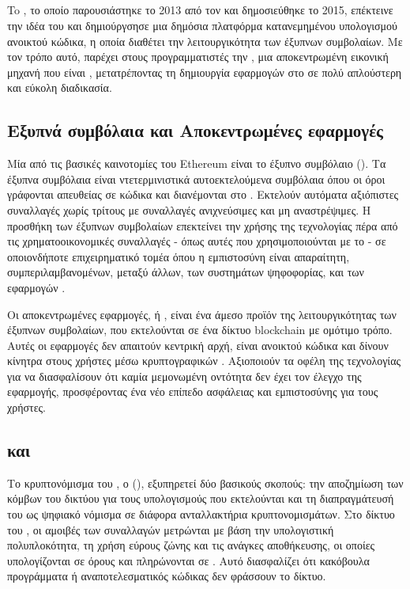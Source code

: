 \subsection{}
To , το οποίο παρουσιάστηκε το 2013 από τον  και δημοσιεύθηκε το 2015, επέκτεινε την ιδέα του  και δημιούργσησε μια δημόσια πλατφόρμα κατανεμημένου υπολογισμού ανοικτού κώδικα, η οποία διαθέτει την λειτουργικότητα των έξυπνων συμβολαίων. Με τον τρόπο αυτό, παρέχει στους προγραμματιστές την , μια αποκεντρωμένη εικονική μηχανή που είναι , μετατρέποντας τη δημιουργία εφαρμογών στο  σε πολύ απλούστερη και εύκολη διαδικασία.

\subsection{Εξυπνά συμβόλαια και Aποκεντρωμένες εφαρμογές}
Μία από τις βασικές καινοτομίες του Ethereum είναι το έξυπνο συμβόλαιο (). Τα έξυπνα συμβόλαια είναι ντετερμινιστικά αυτοεκτελούμενα συμβόλαια όπου οι όροι γράφονται απευθείας σε κώδικα και διανέμονται στο . Εκτελούν αυτόματα αξιόπιστες συναλλαγές χωρίς τρίτους με συναλλαγές ανιχνεύσιμες και μη αναστρέψιμες. Η προσθήκη των έξυπνων συμβολαίων επεκτείνει την χρήσης της τεχνολογίας  πέρα από τις χρηματοοικονομικές συναλλαγές - όπως αυτές που χρησιμοποιούνται με το  - σε οποιονδήποτε επιχειρηματικό τομέα όπου η εμπιστοσύνη είναι απαραίτητη, συμπεριλαμβανομένων, μεταξύ άλλων, των συστημάτων ψηφοφορίας, και των εφαρμογών .

Οι αποκεντρωμένες εφαρμογές, ή , είναι ένα άμεσο προϊόν της λειτουργικότητας των έξυπνων συμβολαίων, που εκτελούνται σε ένα δίκτυο blockchain με ομότιμο τρόπο. Αυτές οι εφαρμογές δεν απαιτούν κεντρική αρχή, είναι ανοικτού κώδικα και δίνουν κίνητρα στους χρήστες μέσω κρυπτογραφικών . Αξιοποιούν τα οφέλη της τεχνολογίας για να διασφαλίσουν ότι καμία μεμονωμένη οντότητα δεν έχει τον έλεγχο της εφαρμογής, προσφέροντας ένα νέο επίπεδο ασφάλειας και εμπιστοσύνης για τους χρήστες.

\subsection{ και }
Το κρυπτονόμισμα του , ο  (), εξυπηρετεί δύο βασικούς σκοπούς: την αποζημίωση των κόμβων του δικτύου για τους υπολογισμούς που εκτελούνται και τη διαπραγμάτευσή του ως ψηφιακό νόμισμα σε διάφορα ανταλλακτήρια κρυπτονομισμάτων. Στο δίκτυο του , οι αμοιβές των συναλλαγών μετρώνται με βάση την υπολογιστική πολυπλοκότητα, τη χρήση εύρους ζώνης και τις ανάγκες αποθήκευσης, οι οποίες υπολογίζονται σε όρους  και πληρώνονται σε . Αυτό διασφαλίζει ότι κακόβουλα προγράμματα ή αναποτελεσματικός κώδικας δεν φράσσουν το δίκτυο.

